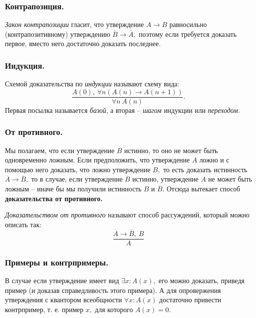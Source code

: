 \subsubsection{Контрапозиция.}

\textit{Закон контрапозиции} гласит, что утверждение $A \rightarrow B$ равносильно (контрапозитивному) утверждению $\overline{B} \rightarrow \overline{A},$ поэтому если требуется доказать первое, вместо него достаточно доказать последнее.

\subsubsection{Индукция.}

\begin{definition}
    Схемой доказательства по \textit{индукции} называют схему вида:
    $$\frac{A(0), \ \forall n(A(n) \rightarrow A(n + 1))}{\forall n \ A(n)}.$$
    Первая посылка называется \textit{базой}, а вторая -- \textit{шагом} индукции или \textit{переходом.}
\end{definition}

\subsubsection{От противного.}

Мы полагаем, что если утверждение $B$ истинно, то оно не может быть одновременно ложным. Если предположить, что утверждение $A$ ложно и с помощью него доказать, что ложно утверждение $B,$ то есть доказать истинность $\overline{A} \rightarrow \overline{B},$ то в случае, если утверждение $B$ истинно, утверждение $A$ не может быть ложным -- иначе бы мы получили истинность $B$ и $\overline{B}.$ Отсюда вытекает способ \textbf{доказательства от противного.}

\begin{definition}
    \textit{Доказательством от противного} называют способ рассуждений, который можно описать так:
    $$\frac{\overline{A} \rightarrow \overline{B}, \ B}{A}$$
\end{definition}

\subsubsection{Примеры и контрпримеры.}

В случае если утверждение имеет вид $\exists x : A(x),$ его можно доказать, приведя пример (и доказав справедливость этого примера). А для опровержения утверждения с квантором всеобщности $\forall x : A(x)$ достаточно привести контрпример, т. е. пример $x,$ для которого $A(x) = 0.$

